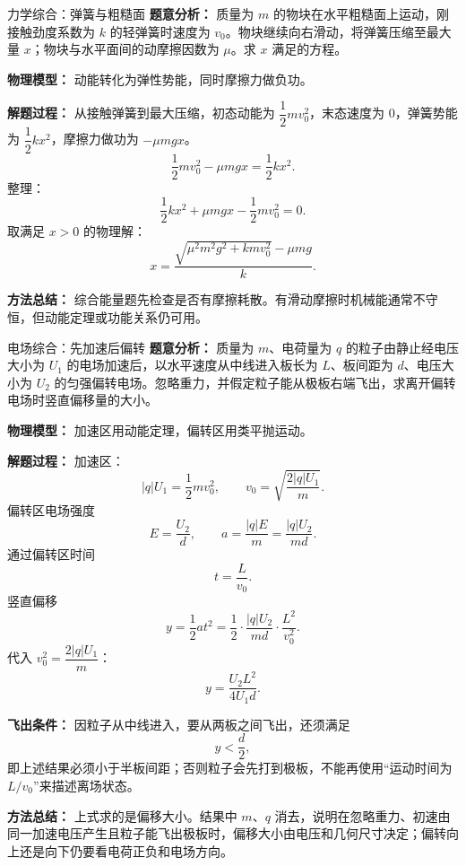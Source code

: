\begin{examplebox}{力学综合：弹簧与粗糙面}
\textbf{题意分析：} 质量为 $m$ 的物块在水平粗糙面上运动，刚接触劲度系数为 $k$ 的轻弹簧时速度为 $v_0$。物块继续向右滑动，将弹簧压缩至最大量 $x$；物块与水平面间的动摩擦因数为 $\mu$。求 $x$ 满足的方程。

\textbf{物理模型：} 动能转化为弹性势能，同时摩擦力做负功。

\begin{center}

\end{center}

\textbf{解题过程：}
从接触弹簧到最大压缩，初态动能为 $\dfrac12mv_0^2$，末态速度为 0，弹簧势能为 $\dfrac12kx^2$，摩擦力做功为 $-\mu mgx$。
\[
\frac12mv_0^2-\mu mgx=\frac12kx^2.
\]
整理：
\[
\frac12kx^2+\mu mgx-\frac12mv_0^2=0.
\]
取满足 $x>0$ 的物理解：
\[
\boxed{x=\frac{\sqrt{\mu^2m^2g^2+kmv_0^2}-\mu mg}{k}}.
\]

\textbf{方法总结：} 综合能量题先检查是否有摩擦耗散。有滑动摩擦时机械能通常不守恒，但动能定理或功能关系仍可用。
\end{examplebox}

\begin{examplebox}{电场综合：先加速后偏转}
\textbf{题意分析：} 质量为 $m$、电荷量为 $q$ 的粒子由静止经电压大小为 $U_1$ 的电场加速后，以水平速度从中线进入板长为 $L$、板间距为 $d$、电压大小为 $U_2$ 的匀强偏转电场。忽略重力，并假定粒子能从极板右端飞出，求离开偏转电场时竖直偏移量的大小。

\textbf{物理模型：} 加速区用动能定理，偏转区用类平抛运动。

\begin{center}

\end{center}

\textbf{解题过程：}
加速区：
\[
|q|U_1=\frac12mv_0^2,
\qquad
v_0=\sqrt{\frac{2|q|U_1}{m}}.
\]
偏转区电场强度
\[
E=\frac{U_2}{d},
\qquad
a=\frac{|q|E}{m}=\frac{|q|U_2}{md}.
\]
通过偏转区时间
\[
t=\frac{L}{v_0}.
\]
竖直偏移
\[
y=\frac12at^2
=\frac12\cdot\frac{|q|U_2}{md}\cdot\frac{L^2}{v_0^2}.
\]
代入 $v_0^2=\dfrac{2|q|U_1}{m}$：
\[
y=\frac{U_2L^2}{4U_1d}.
\]

\textbf{飞出条件：} 因粒子从中线进入，要从两板之间飞出，还须满足
\[
y<\frac d2,
\]
即上述结果必须小于半板间距；否则粒子会先打到极板，不能再使用“运动时间为 $L/v_0$”来描述离场状态。

\textbf{方法总结：} 上式求的是偏移大小。结果中 $m$、$q$ 消去，说明在忽略重力、初速由同一加速电压产生且粒子能飞出极板时，偏移大小由电压和几何尺寸决定；偏转向上还是向下仍要看电荷正负和电场方向。
\end{examplebox}

